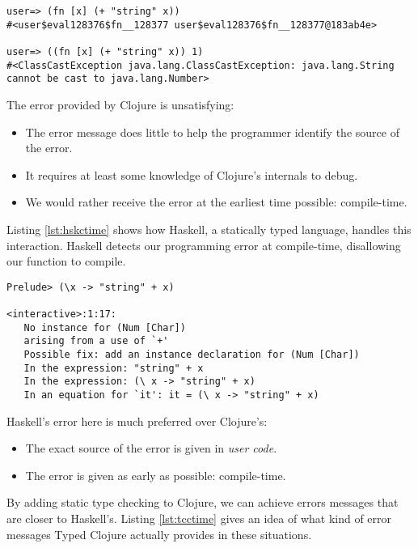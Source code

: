 \begin{lstlisting}[caption=Runtime type errors in Clojure, label=lst:cljrtime]
user=> (fn [x] (+ "string" x))
#<user$eval128376$fn__128377 user$eval128376$fn__128377@183ab4e>

user=> ((fn [x] (+ "string" x)) 1)
#<ClassCastException java.lang.ClassCastException: java.lang.String cannot be cast to java.lang.Number>
\end{lstlisting}

The error provided by Clojure is unsatisfying:

\begin{itemize}
  \item The error message does little to help the programmer identify the source of the error.
  \item It requires at least some knowledge of Clojure's internals to debug.
  \item We would rather receive the error at the earliest time possible: compile-time.
\end{itemize}

Listing \ref{lst:hskctime} shows how Haskell, a statically typed language, handles this interaction.
Haskell detects our programming error at compile-time, disallowing our function to compile.

\begin{lstlisting}[caption=Compile-time type errors in Haskell, label=lst:hskctime]
Prelude> (\x -> "string" + x)

<interactive>:1:17:
   No instance for (Num [Char])
   arising from a use of `+'
   Possible fix: add an instance declaration for (Num [Char])
   In the expression: "string" + x
   In the expression: (\ x -> "string" + x)
   In an equation for `it': it = (\ x -> "string" + x)
\end{lstlisting}

Haskell's error here is much preferred over Clojure's:

\begin{itemize}
  \item The exact source of the error is given in \emph{user code}.
  \item The error is given as early as possible: compile-time.
\end{itemize}

By adding static type checking to Clojure, we can achieve errors messages that are closer to
Haskell's.
Listing \ref{lst:tcctime} gives an idea of what kind of error messages Typed Clojure actually
provides in these situations. 

